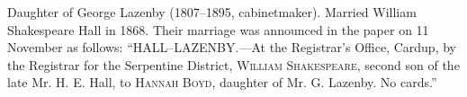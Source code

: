 
Daughter of George Lazenby\cite{HBLMarriageNotice} (1807--1895, cabinetmaker). Married William Shakespeare Hall in 1868. Their marriage was announced in the paper on 11 November as follows:\cite{HBLMarriageNotice} ``HALL--LAZENBY.---At the Registrar's Office, Cardup, by the Registrar for the Serpentine District, \textsc{William Shakespeare}, second son of the late Mr. H. E. Hall, to \textsc{Hannah Boyd}, daughter of Mr. G. Lazenby. No cards.''
